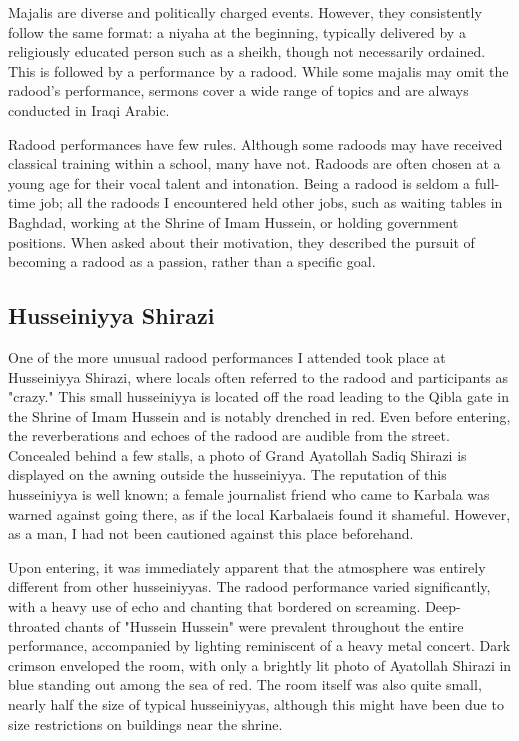 Majalis are diverse and politically charged events. However, they consistently follow the same format: a niyaha at the beginning, typically delivered by a religiously educated person such as a sheikh, though not necessarily ordained. This is followed by a performance by a radood. While some majalis may omit the radood's performance, sermons cover a wide range of topics and are always conducted in Iraqi Arabic.

Radood performances have few rules. Although some radoods may have received classical training within a school, many have not. Radoods are often chosen at a young age for their vocal talent and intonation. Being a radood is seldom a full-time job; all the radoods I encountered held other jobs, such as waiting tables in Baghdad, working at the Shrine of Imam Hussein, or holding government positions. When asked about their motivation, they described the pursuit of becoming a radood as a passion, rather than a specific goal.

\subsection{Husseiniyya Shirazi}
One of the more unusual radood performances I attended took place at Husseiniyya Shirazi, where locals often referred to the radood and participants as "crazy." This small husseiniyya is located off the road leading to the Qibla gate in the Shrine of Imam Hussein and is notably drenched in red. Even before entering, the reverberations and echoes of the radood are audible from the street. Concealed behind a few stalls, a photo of Grand Ayatollah Sadiq Shirazi is displayed on the awning outside the husseiniyya. The reputation of this husseiniyya is well known; a female journalist friend who came to Karbala was warned against going there, as if the local Karbalaeis found it shameful. However, as a man, I had not been cautioned against this place beforehand.

Upon entering, it was immediately apparent that the atmosphere was entirely different from other husseiniyyas. The radood performance varied significantly, with a heavy use of echo and chanting that bordered on screaming. Deep-throated chants of "Hussein Hussein" were prevalent throughout the entire performance, accompanied by lighting reminiscent of a heavy metal concert. Dark crimson enveloped the room, with only a brightly lit photo of Ayatollah Shirazi in blue standing out among the sea of red. The room itself was also quite small, nearly half the size of typical husseiniyyas, although this might have been due to size restrictions on buildings near the shrine.

